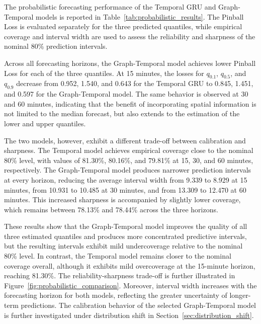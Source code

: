 The probabilistic forecasting performance of the Temporal GRU and
Graph-Temporal models is reported in Table~\ref{tab:probabilistic_results}.
The Pinball Loss is evaluated separately for the three predicted quantiles,
while empirical coverage and interval width are used to assess the reliability
and sharpness of the nominal 80\% prediction intervals.

Across all forecasting horizons, the Graph-Temporal model achieves lower
Pinball Loss for each of the three quantiles. At 15 minutes, the losses for
$q_{0.1}$, $q_{0.5}$, and $q_{0.9}$ decrease from 0.952, 1.540, and 0.643
for the Temporal GRU to 0.845, 1.451, and 0.597 for the Graph-Temporal
model. The same behavior is observed at 30 and 60 minutes, indicating that
the benefit of incorporating spatial information is not limited to the
median forecast, but also extends to the estimation of the lower and upper
quantiles.

The two models, however, exhibit a different trade-off between calibration
and sharpness. The Temporal model achieves empirical coverage close to the
nominal 80\% level, with values of 81.30\%, 80.16\%, and 79.81\% at 15,
30, and 60 minutes, respectively. The Graph-Temporal model produces narrower
prediction intervals at every horizon, reducing the average interval width
from 9.339 to 8.929 at 15 minutes, from 10.931 to 10.485 at 30 minutes, and
from 13.309 to 12.470 at 60 minutes. This increased sharpness is accompanied
by slightly lower coverage, which remains between 78.13\% and 78.44\% across
the three horizons.

These results show that the Graph-Temporal model improves the quality of all
three estimated quantiles and produces more concentrated predictive
intervals, but the resulting intervals exhibit mild undercoverage relative
to the nominal 80\% level. In contrast, the Temporal model remains closer to
the nominal coverage overall, although it exhibits mild overcoverage at the
15-minute horizon, reaching 81.30\%.
The reliability-sharpness trade-off is further illustrated in
Figure~\ref{fig:probabilistic_comparison}.
Moreover, interval width increases with the
forecasting horizon for both models, reflecting the greater uncertainty of
longer-term predictions. The calibration behavior of the selected
Graph-Temporal model is further investigated under distribution shift in
Section~\ref{sec:distribution_shift}.

